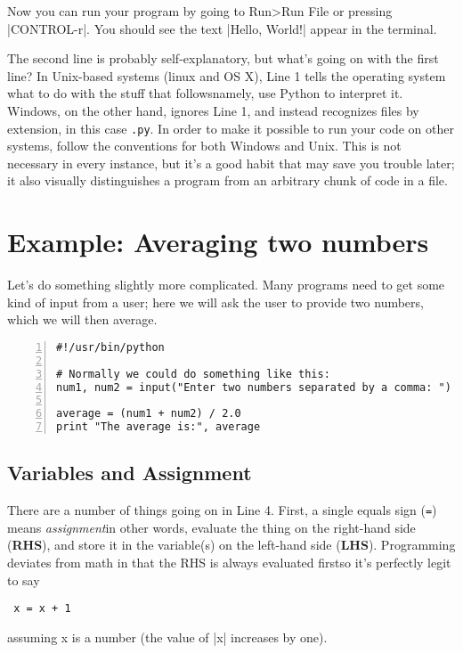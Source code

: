 \documentclass{article}
\begin{document}
Now you can run your program by going to Run\textgreater Run File or pressing |CONTROL-r|.  You should
see the text |Hello, World!| appear in the terminal.

The second line is probably self-explanatory, but what's going on with the first
line?  In Unix-based systems (linux and OS X), Line 1 tells the operating system
what to do with the stuff that follows\textemdash namely, use Python to
interpret it.  Windows, on the other hand, ignores Line 1, and instead
recognizes files by extension, in this case \texttt{.py}.  In order to make it
possible to run your code on other systems, follow the conventions for both
Windows and Unix.  This is not necessary in every instance, but it's a good
habit that may save you trouble later; it also visually distinguishes a program from an arbitrary chunk of code in a file.

\section{Example: Averaging two numbers}

Let's do something slightly more complicated.  Many programs need to get some
kind of input from a user; here we will ask the user to provide two numbers,
which we will then average.

\begin{Verbatim}[numbers=left]
#!/usr/bin/python

# Normally we could do something like this:
num1, num2 = input("Enter two numbers separated by a comma: ")

average = (num1 + num2) / 2.0
print "The average is:", average
\end{Verbatim}

\subsection{Variables and Assignment}
There are a number of things going on in Line 4.  First, a single equals sign
(\texttt{=}) means \textit{assignment}\textemdash in other words, evaluate the
thing on the right-hand side (\textbf{RHS}), and store it in the variable(s) on
the left-hand side (\textbf{LHS}).  Programming deviates from math in that the
RHS is always evaluated first\textemdash so it's perfectly legit to say

\begin{Verbatim}
 x = x + 1
\end{Verbatim}

 assuming x is a number (the value of |x| increases by one).
\end{document}
